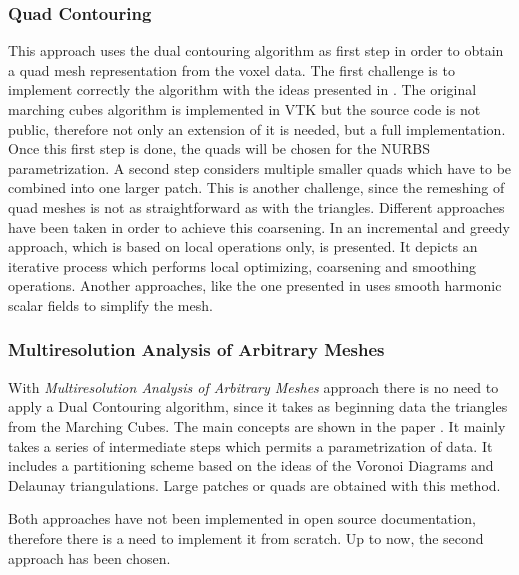 \subsubsection{Quad Contouring}
This approach uses the dual contouring algorithm as first step in order to obtain a quad mesh
representation from the voxel data. The first challenge is to implement correctly the algorithm
with the ideas presented in \cite{Hermite2002}. The original marching cubes algorithm is
implemented in VTK but the source code is not public, therefore not only an extension
of it is needed, but a full implementation. Once this first step is done, the quads will be chosen for the
NURBS parametrization. A second step considers multiple smaller quads which have to be
combined into one larger patch. This is another challenge, since the remeshing of quad meshes
is not as straightforward as with the triangles. Different approaches have been taken in order to
achieve this coarsening. In \cite{Puppo2010} an incremental and greedy approach, which is based on local operations only, is presented. It depicts an iterative process which performs local optimizing, coarsening and smoothing operations. Another approaches, like
the one presented in \cite{Dong2005} uses smooth harmonic scalar fields to simplify the mesh.


\subsubsection{Multiresolution Analysis of Arbitrary Meshes}
With \textit{Multiresolution Analysis of Arbitrary Meshes} approach there is no need to apply a Dual Contouring algorithm, since it takes as
beginning data the triangles from the Marching Cubes. The main concepts are shown in the paper \cite{eck1996automatic}. It mainly takes a series of intermediate steps which permits a parametrization of data. It includes a partitioning scheme based on the ideas of the Voronoi Diagrams and Delaunay triangulations. Large patches or quads are obtained with this method. 


Both approaches have not been implemented in open source documentation, therefore there is a need to implement it from scratch. Up to now, the second approach has been chosen.

